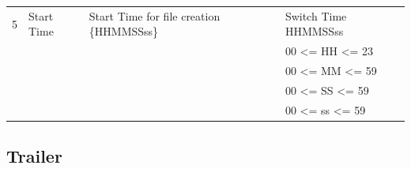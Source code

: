 \documentclass[12pt,twoside]{article}
\begin{document}
\begin{center}
\begin{tabular}{rlll}
              5  &  Start Time           &  Start Time for file creation \{HHMMSSss\}  &  Switch Time HHMMSSss            \\
                 &                       &                                             &  00 <= HH <= 23                  \\
                 &                       &                                             &  00 <= MM <= 59                  \\
                 &                       &                                             &  00 <= SS <= 59                  \\
                 &                       &                                             &  00 <= ss <= 59                  \\
\hline
\end{tabular}
\end{center}



\normalsize
\subsection{Trailer}
\label{sec-7-3}

\footnotesize
\end{document}
